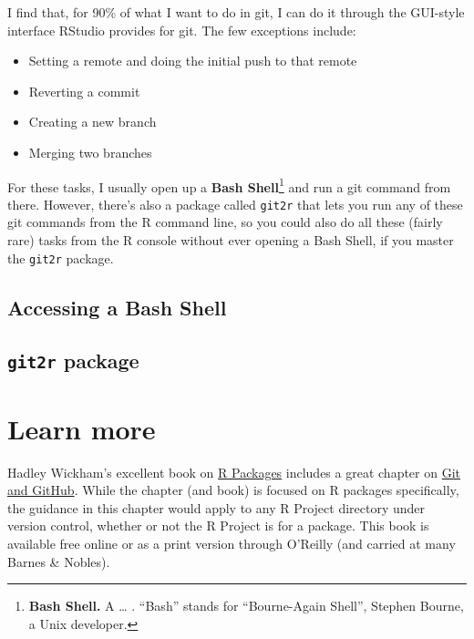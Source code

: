 \documentclass[]{tufte-book}
\providecommand{\tightlist}{%
  \setlength{\itemsep}{0pt}\setlength{\parskip}{0pt}}
\begin{document}
I find that, for 90\% of what I want to do in git, I can do it through the GUI-style
interface RStudio provides for git. The few exceptions include:

\begin{itemize}
\tightlist
\item
  Setting a remote and doing the initial push to that remote
\item
  Reverting a commit
\item
  Creating a new branch
\item
  Merging two branches
\end{itemize}

For these tasks, I usually open up a \textbf{Bash Shell}\footnote{\textbf{Bash Shell.} A \ldots{} . ``Bash'' stands
  for ``Bourne-Again Shell'', Stephen Bourne, a Unix developer.} and run a git command from
there. However, there's also a package called \texttt{git2r} that lets you run any of these
git commands from the R command line, so you could also do all these (fairly rare) tasks
from the R console without ever opening a Bash Shell, if you master the \texttt{git2r} package.

\hypertarget{accessing-a-bash-shell}{%
\subsection{Accessing a Bash Shell}\label{accessing-a-bash-shell}}

\hypertarget{git2r-package}{%
\subsection{\texorpdfstring{\texttt{git2r} package}{git2r package}}\label{git2r-package}}

\hypertarget{learn-more-1}{%
\section{Learn more}\label{learn-more-1}}

Hadley Wickham's excellent book on \href{http://r-pkgs.had.co.nz/}{R Packages} includes a great
chapter on \href{http://r-pkgs.had.co.nz/git.html}{Git and GitHub}. While the chapter (and book) is
focused on R packages specifically, the guidance in this chapter would apply to any
R Project directory under version control, whether or not the R Project is for a package.
This book is available free online or as a print version through O'Reilly (and
carried at many Barnes \& Nobles).
\end{document}
